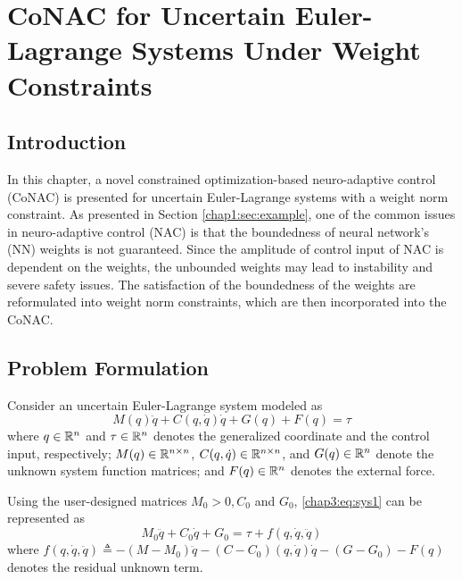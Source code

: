 
\chapter{
    CoNAC for Uncertain Euler-Lagrange Systems Under Weight Constraints
} \label{chapter3}

\section{Introduction} 

In this chapter, a novel constrained optimization-based neuro-adaptive control (CoNAC) is presented for uncertain Euler-Lagrange systems with a weight norm constraint. 
As presented in Section \ref{chap1:sec:example}, one of the common issues in neuro-adaptive control (NAC) is that the boundedness of neural network’s (NN) weights is not guaranteed.
Since the amplitude of control input of NAC is dependent on the weights, the unbounded weights may lead to instability and severe safety issues. 
The satisfaction of the boundedness of the weights are reformulated into weight norm constraints, which are then incorporated into the CoNAC.

\section{Problem Formulation}

Consider an uncertain Euler-Lagrange system modeled as
\begin{equation}
    M(q)\ddot q + C(q,\dot q)\dot q + G(q) + F(q) = \tau
    \label{chap3:eq:sys1}
\end{equation}
where $q\in \mathbb{R}^n$ and $\tau\in\mathbb{R}^n$ denotes the generalized coordinate and the control input, respectively; $M(q)\in\mathbb{R}^{n\times n}$, $C(q,\dot q)\in\mathbb{R}^{n\times n}$, and $G(q)\in\mathbb{R}^{n}$ denote the unknown system function matrices; and $F(q)\in\mathbb{R}^{n}$ denotes the external force.

Using the user-designed matrices $M_0>0,C_0$ and $G_0$, \eqref{chap3:eq:sys1} can be represented as 
\begin{equation}
    M_0\ddot q+C_0\dot q+G_0 = \tau + f(q,\dot q,\ddot q)
    \label{chap3:eq:sys2}
\end{equation}
where $f(q,\dot q,\ddot q) \triangleq -(M-M_0)\ddot q-(C-C_0)(q,\dot q)\dot q -(G-G_0) -F(q)$ denotes the residual unknown term.

